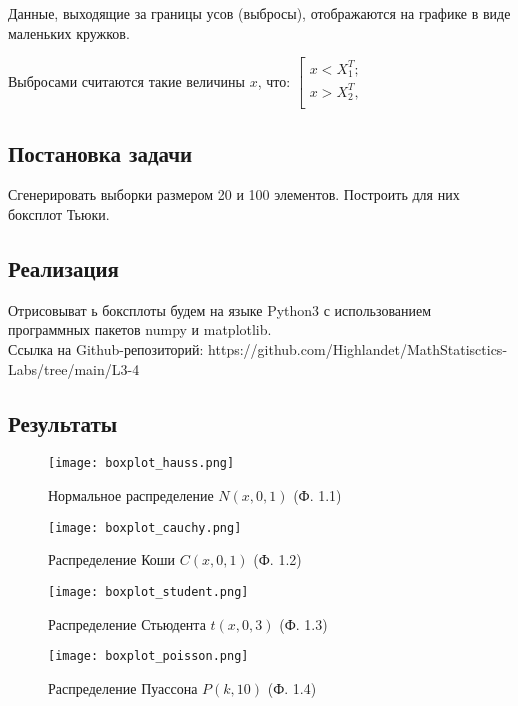\documentclass[14pt]{extarticle}
\begin{document}
Данные, выходящие за границы усов (выбросы), отображаются на графике в виде маленьких кружков.

Выбросами считаются такие величины \(x\), что:
$\left[
      \begin{gathered}
        x < X_1^T; \\
        x > X_2^T, \\
      \end{gathered}
\right.$

\subsection{Постановка задачи}

Сгенерировать выборки размером 20 и 100 элементов. Построить для них боксплот Тьюки.

\subsection{Реализация}

Отрисовыват ь боксплоты будем на языке Python3 с использованием программных пакетов numpy и matplotlib.\\
Ссылка на Github-репозиторий: https://github.com/Highlandet/MathStatisctics-Labs/tree/main/L3-4

\subsection{Результаты}

\begin{figure}[H]
    \centering
    \texttt{[image: boxplot\_hauss.png]}
    \caption{Нормальное распределение \(N(x, 0, 1)\) (Ф. 1.1)}
    \label{fig:enter-label}
\end{figure}

\begin{figure}[H]
    \centering
    \texttt{[image: boxplot\_cauchy.png]}
    \caption{Распределение Коши \(C(x, 0, 1)\) (Ф. 1.2)}
    \label{fig:enter-label}
\end{figure}

\begin{figure}[H]
    \centering
    \texttt{[image: boxplot\_student.png]}
    \caption{Распределение Стьюдента \(t(x, 0, 3)\) (Ф. 1.3)}
    \label{fig:enter-label}
\end{figure}

\begin{figure}[H]
    \centering
    \texttt{[image: boxplot\_poisson.png]}
    \caption{Распределение Пуассона \(P(k, 10)\) (Ф. 1.4)}
    \label{fig:enter-label}
\end{figure}
\end{document}
